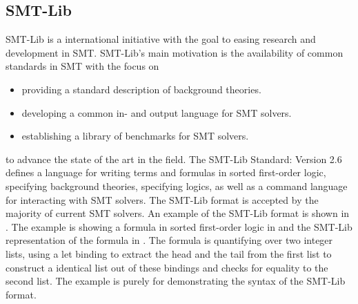 \subsection{SMT-Lib}
SMT-Lib is a international initiative with the goal to easing
research and development in SMT.
SMT-Lib's main motivation is the availability of common standards in SMT
with the focus on
\begin{itemize}
    \item providing a standard description of background theories.
    \item developing a common in- and output language for SMT solvers.
    \item establishing a library of benchmarks for SMT solvers.
\end{itemize}
to advance the state of the art in the field.
The SMT-Lib Standard: Version 2.6~\cite{smtlib} defines a language for
writing terms and formulas in sorted first-order logic,
specifying background theories,
specifying logics,
as well as a command language for interacting with SMT solvers.
The SMT-Lib format is accepted by the majority of current SMT solvers.
An example of the SMT-Lib format is shown in .
The example is showing a formula in sorted first-order logic in 
and the SMT-Lib representation of the formula in .
The formula is quantifying over two integer lists,
using a let binding to extract the head and the tail from the first list
to construct a identical list out of these bindings and checks for equality to the second list.
The example is purely for demonstrating the syntax of the SMT-Lib format.

